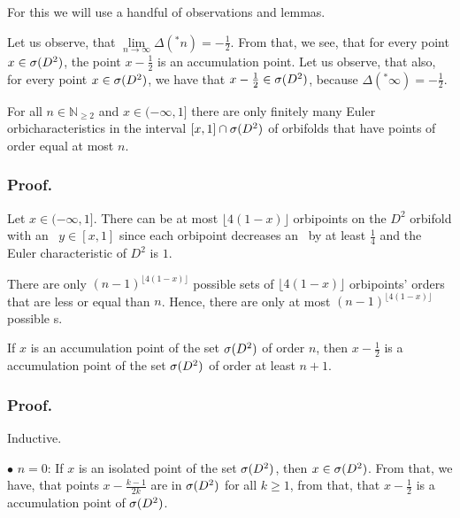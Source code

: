 For this we will use  
a handful of observations and lemmas. 
\begin{observation}\label{accumulation_points_are_in_the_spectrum}
Let us observe, that $\lim\limits_{n \to \infty} \Delta(^\ast n) = -\frac{1}{2}$. From that, 
we see, 
that for every point $x \in {{\sigma}(D^2)}$, the point $x - \frac{1}{2}$ is an accumulation point. 
Let us observe, that also, for every point $x \in {{\sigma}(D^2)}$, we have that $x - \frac{1}{2} 
\in {{\sigma}(D^2)}$, 
because $\Delta(^\ast \infty) = -\frac{1}{2}$. 
\end{observation}

\begin{lemma}\label{finiteness_lemma}
For all $n \in \mathbb{N}_{\geq 2}$ and $x \in (-\infty, 1]$ there are only finitely 
many Euler orbicharacteristics
in the interval $[x,1] \cap {{\sigma}(D^2)}$ of orbifolds that have points of order equal 
at most $n$. 
\end{lemma}
\subsubsection{Proof.} 
Let $x \in (-\infty, 1]$. There can be at most $\lfloor 4(1-x) \rfloor$ orbipoints on the 
$D^2$ orbifold 
with an \Eoc\ $y \in [x,1]$ since each orbipoint decreases an \Eoc\ by at least $\frac{1}{4}$ 
and the Euler characteristic of $D^2$ is $1$. 

There are only $(n-1)^{\lfloor 4(1-x) \rfloor}$ possible sets of $\lfloor 4(1-x) \rfloor$ 
orbipoints' orders that are less or equal than $n$. Hence, there are only at most 
$(n-1)^{\lfloor 4(1-x) \rfloor}$ possible \Eoc s.


\begin{lemma}\label{first_order_lemma}
If $x$ is an accumulation point of the set ${{\sigma}(D^2)}$ of order $n$, then $x-\frac{1}{2}$ is a
 accumulation point of the set ${{\sigma}(D^2)}$ of order at least $n+1$. 
\end{lemma}
\subsubsection{Proof.}
Inductive. 

$\bullet$ $n = 0$: If $x$ is an isolated point of the set ${{\sigma}(D^2)}$, then $x \in {{\sigma}(D^2)}$. 
From that, we 
have, that points $x - \frac{k-1}{2k}$ are in ${{\sigma}(D^2)}$ for all $k \geq 1$, from that, that 
$x-\frac{1}{2}$ is a 
accumulation point of ${{\sigma}(D^2)}$. 

